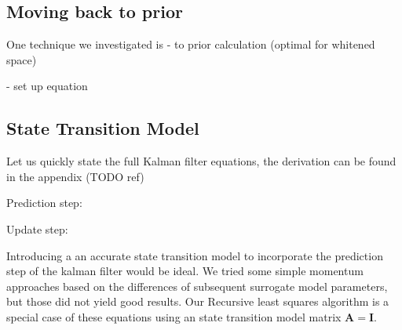 \subsection{Moving back to prior}
One technique we investigated is 
- to prior calculation (optimal for whitened space)

- set up equation

\subsection{State Transition Model}
Let us quickly state the full Kalman filter equations, the
derivation can be found in the appendix (TODO ref)

Prediction step:

Update step:

Introducing a an accurate state transition model to incorporate the
prediction step of the kalman filter would be ideal.
We tried some simple momentum approaches based on the differences of
subsequent surrogate model parameters, but those did not yield
good results.
Our Recursive least squares algorithm is a special case of these
equations using an state transition model matrix $\mathbf{A} = \mathbf{I}$.
